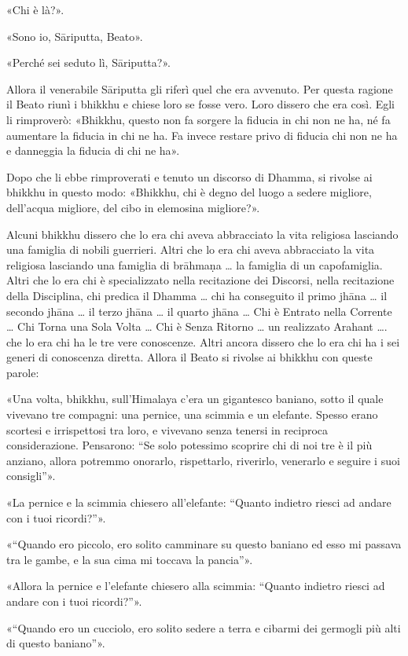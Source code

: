 «Chi è là?».

«Sono io, Sāriputta, Beato».

«Perché sei seduto lì, Sāriputta?».

Allora il venerabile Sāriputta gli riferì quel che era avvenuto. Per questa
ragione il Beato riunì i bhikkhu e chiese loro se fosse vero. Loro dissero che
era così. Egli li rimproverò: «Bhikkhu, questo non fa sorgere la fiducia in chi
non ne ha, né fa aumentare la fiducia in chi ne ha. Fa invece restare privo di
fiducia chi non ne ha e danneggia la fiducia di chi ne ha».

Dopo che li ebbe rimproverati e tenuto un discorso di Dhamma, si rivolse ai
bhikkhu in questo modo: «Bhikkhu, chi è degno del luogo a sedere migliore,
dell’acqua migliore, del cibo in elemosina migliore?».

Alcuni bhikkhu dissero che lo era chi aveva abbracciato la vita religiosa
lasciando una famiglia di nobili guerrieri. Altri che lo era chi aveva
abbracciato la vita religiosa lasciando una famiglia di brāhmaṇa … la famiglia
di un capofamiglia. Altri che lo era chi è specializzato nella recitazione dei
Discorsi, nella recitazione della Disciplina, chi predica il Dhamma … chi ha
conseguito il primo jhāna … il secondo jhāna … il terzo jhāna … il quarto jhāna
… Chi è Entrato nella Corrente … Chi Torna una Sola Volta … Chi è Senza Ritorno
… un realizzato Arahant …. che lo era chi ha le tre vere conoscenze. Altri
ancora dissero che lo era chi ha i sei generi di conoscenza diretta. Allora il
Beato si rivolse ai bhikkhu con queste parole:

«Una volta, bhikkhu, sull’Himalaya c’era un gigantesco baniano, sotto il quale
vivevano tre compagni: una pernice, una scimmia e un elefante. Spesso erano
scortesi e irrispettosi tra loro, e vivevano senza tenersi in reciproca
considerazione. Pensarono: “Se solo potessimo scoprire chi di noi tre è il più
anziano, allora potremmo onorarlo, rispettarlo, riverirlo, venerarlo e seguire i
suoi consigli”».

«La pernice e la scimmia chiesero all’elefante: “Quanto indietro riesci ad
andare con i tuoi ricordi?”».

«“Quando ero piccolo, ero solito camminare su questo baniano ed esso mi passava
tra le gambe, e la sua cima mi toccava la pancia”».

«Allora la pernice e l’elefante chiesero alla scimmia: “Quanto indietro riesci
ad andare con i tuoi ricordi?”».

«“Quando ero un cucciolo, ero solito sedere a terra e cibarmi dei germogli più
alti di questo baniano”».

